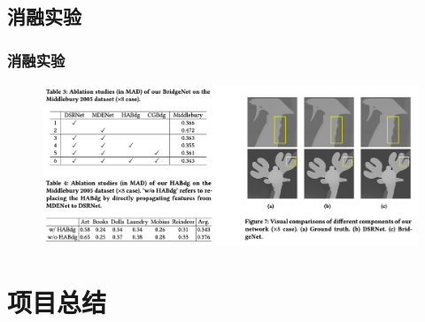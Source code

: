 \documentclass[aspectratio=169,12pt]{beamer}
\begin{document}
\subsection{消融实验}
\begin{frame}
	\frametitle{消融实验}
	\begin{figure}
		\includegraphics[scale=0.45]{24.png}
	\end{figure}
\end{frame}

\section{项目总结}
\end{document}

